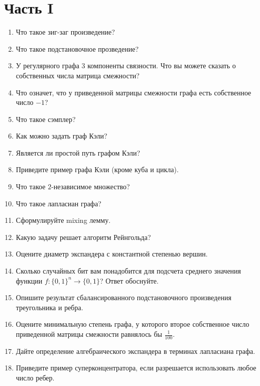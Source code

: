 

\newcommand{\norm}[1]{\left\lVert#1\right\rVert}




\section*{Часть I}
\begin{enumerate}
    \item Что такое зиг-заг произведение?
    \item Что такое подстановочное прозведение?
    \item У регулярного графа $3$ компоненты связности. Что вы можете сказать о собственных числа матрица
        смежности?
    \item Что означет, что у приведенной матрицы смежности графа есть собственное число $-1$?
    \item Что такое сэмплер?
    \item Как можно задать граф Кэли?
    \item Является ли простой путь графом Кэли?
    \item Приведите пример графа Кэли (кроме куба и цикла).
    \item Что такое $2$-независимое множество?
    \item Что такое лапласиан графа?
    \item Сформулируйте mixing лемму.
    \item Какую задачу решает алгоритм Рейнгольда?
    \item Оцените диаметр экспандера с константной степенью вершин.
    \item Сколько случайных бит вам понадобится для подсчета среднего значения функции $f\colon \{0, 1\}^n
        \to \{0, 1\}$? Ответ обоснуйте.
    \item Опишите результат сбалансированного подстановочного произведения треугольника и ребра.
    \item Оцените минимальную степень графа, у которого второе собственное число приведенной матрицы
        смежности равнялось бы $\frac{1}{100}$.
    \item Дайте определение алгебраического экспандера в терминах лапласиана графа.
    \item Приведите пример суперконцентратора, если разрешается использовать любое число ребер.
\end{enumerate}

